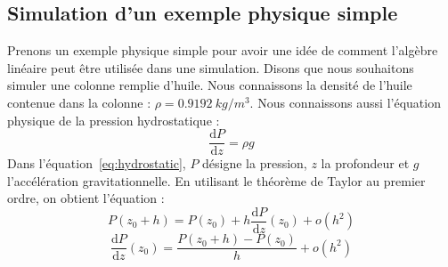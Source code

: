 \subsection{Simulation d'un exemple physique simple}
Prenons un exemple physique simple pour avoir une idée de comment l'algèbre linéaire peut être utilisée dans une simulation.
%
Disons que nous souhaitons simuler une colonne remplie d'huile.
%
Nous connaissons la densité de l'huile contenue dans la colonne : $\rho = 0.9192~kg/m^3$.
%
Nous connaissons aussi l'équation physique de la pression hydrostatique :
%
\begin{equation}
\label{eq:hydrostatic}
\frac{\mathrm d P}{\mathrm d z} = \rho{}g
\end{equation}
%
Dans l'équation~\eqref{eq:hydrostatic}, $P$ désigne la pression, $z$ la profondeur et $g$ l'accélération gravitationnelle.
%
En utilisant le théorème de Taylor au premier ordre, on obtient l'équation :
%
\begin{equation}
P(z_0+h) = P(z_0) + h \frac{\mathrm d P}{\mathrm d z} (z_0) + o(h^2)
\end{equation}
\begin{equation}
\frac{\mathrm d P}{\mathrm d z} (z_0) = \frac{P(z_0+h) - P(z_0)}{h} + o(h^2)
\end{equation}

